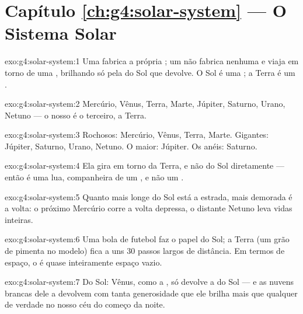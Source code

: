 \section*{Capítulo \ref{ch:g4:solar-system} --- O Sistema Solar}

\begin{solution}{exo:g4:solar-system:1}
Uma  fabrica a própria ; um  não fabrica nenhuma e
viaja em torno de uma , brilhando só pela  do Sol que
devolve. O Sol é uma ; a Terra é um .
\end{solution}

\begin{solution}{exo:g4:solar-system:2}
Mercúrio, Vênus, Terra, Marte, Júpiter, Saturno, Urano, Netuno --- o
nosso é o terceiro, a Terra.
\end{solution}

\begin{solution}{exo:g4:solar-system:3}
Rochosos: Mercúrio, Vênus, Terra, Marte. Gigantes: Júpiter, Saturno,
Urano, Netuno. O maior: Júpiter. Os anéis: Saturno.
\end{solution}

\begin{solution}{exo:g4:solar-system:4}
Ela gira em torno da Terra, e não do Sol diretamente --- então é uma
lua, companheira de um , e não um .
\end{solution}

\begin{solution}{exo:g4:solar-system:5}
Quanto mais longe do Sol está a estrada, mais demorada é a volta: o
próximo Mercúrio corre a volta depressa, o distante Netuno leva
vidas inteiras.
\end{solution}

\begin{solution}{exo:g4:solar-system:6}
Uma bola de futebol faz o papel do Sol; a Terra (um grão de pimenta
no modelo) fica a uns $30$ passos largos de distância. Em termos de
espaço, o  é quase inteiramente espaço vazio.
\end{solution}

\begin{solution}{exo:g4:solar-system:7}
Do Sol: Vênus, como a , só devolve a  do Sol --- e as nuvens
brancas dele a devolvem com tanta generosidade que ele brilha mais
que qualquer  de verdade no nosso céu do começo da noite.
\end{solution}

